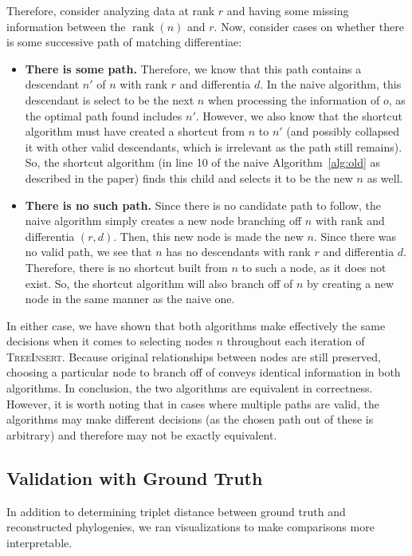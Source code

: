 Therefore, consider analyzing data at rank $r$ and having some missing information between the $\operatorname{rank}(n)$ and $r$.
Now, consider cases on whether there is some successive path of matching differentiae:

\begin{itemize}
  \item \textbf{There is some path.}
  Therefore, we know that this path contains a descendant $n'$ of $n$ with rank $r$ and differentia $d$.
  In the naive algorithm, this descendant is select to be the next $n$ when processing the information of $o$, as the optimal path found includes $n'$.
  However, we also know that the shortcut algorithm must have created a shortcut from $n$ to $n'$ (and possibly collapsed it with other valid descendants, which is irrelevant as the path still remains).
  So, the shortcut algorithm (in line 10 of the naive Algorithm~\ref{alg:old} as described in the paper) finds this child and selects it to be the new $n$ as well.
  \item \textbf{There is no such path.}
  Since there is no candidate path to follow, the naive algorithm simply creates a new node branching off $n$ with rank and differentia $(r, d)$.
  Then, this new node is made the new $n$.
  Since there was no valid path, we see that $n$ has no descendants with rank $r$ and differentia $d$.
  Therefore, there is no shortcut built from $n$ to such a node, as it does not exist.
  So, the shortcut algorithm will also branch off of $n$ by creating a new node in the same manner as the naive one.
\end{itemize}

In either case, we have shown that both algorithms make effectively the same decisions when it comes to selecting nodes $n$ throughout each iteration of \textsc{TreeInsert}.
Because original relationships between nodes are still preserved, choosing a particular node to branch off of conveys identical information in both algorithms.
In conclusion, the two algorithms are equivalent in correctness.
However, it is worth noting that in cases where multiple paths are valid, the algorithms may make different decisions (as the chosen path out of these is arbitrary) and therefore may not be exactly equivalent.

\subsection{Validation with Ground Truth}

In addition to determining triplet distance between ground truth and reconstructed phylogenies, we ran visualizations to make comparisons more interpretable.


